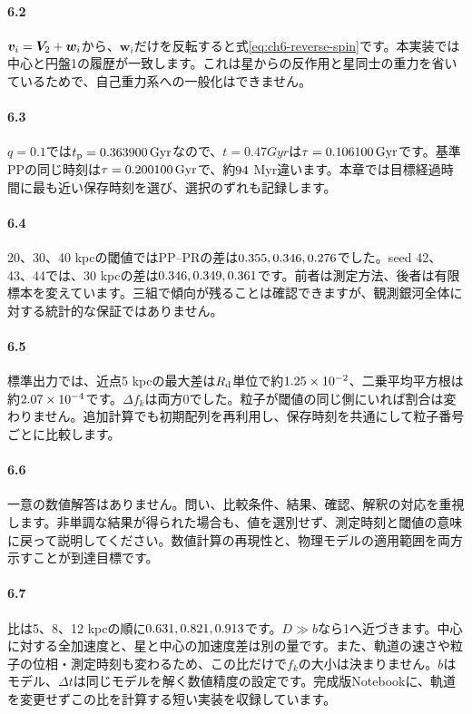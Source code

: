 \paragraph{6.2}
$\boldsymbol v_i=\boldsymbol V_2+\boldsymbol w_i$から、$\boldsymbol w_i$だけを反転すると式\eqref{eq:ch6-reverse-spin}です。本実装では中心と円盤1の履歴が一致します。これは星からの反作用と星同士の重力を省いているためで、自己重力系への一般化はできません。

\paragraph{6.3}
$q=0.1$では$t_{\rm p}=0.363900\,\mathrm{Gyr}$なので、$t=0.47\unit{Gyr}$は$\tau=0.106100\,\mathrm{Gyr}$です。基準PPの同じ時刻は$\tau=0.200100\,\mathrm{Gyr}$で、約$94$ Myr違います。本章では目標経過時間に最も近い保存時刻を選び、選択のずれも記録します。

\paragraph{6.4}
20、30、40 kpcの閾値ではPP--PRの差は$0.355,0.346,0.276$でした。seed 42、43、44では、30 kpcの差は$0.346,0.349,0.361$です。前者は測定方法、後者は有限標本を変えています。三組で傾向が残ることは確認できますが、観測銀河全体に対する統計的な保証ではありません。

\paragraph{6.5}
標準出力では、近点5 kpcの最大差は$R_{\rm d}$単位で約$1.25\times 10^{-2}$、二乗平均平方根は約$2.07\times 10^{-4}$です。$\Delta f_k$は両方0でした。粒子が閾値の同じ側にいれば割合は変わりません。追加計算でも初期配列を再利用し、保存時刻を共通にして粒子番号ごとに比較します。

\paragraph{6.6}
一意の数値解答はありません。問い、比較条件、結果、確認、解釈の対応を重視します。非単調な結果が得られた場合も、値を選別せず、測定時刻と閾値の意味に戻って説明してください。数値計算の再現性と、物理モデルの適用範囲を両方示すことが到達目標です。

\paragraph{6.7}
比は5、8、12 kpcの順に$0.631,0.821,0.913$です。$D\gg b$なら1へ近づきます。中心に対する全加速度と、星と中心の加速度差は別の量です。また、軌道の速さや粒子の位相・測定時刻も変わるため、この比だけで$f_k$の大小は決まりません。$b$はモデル、$\Delta t$は同じモデルを解く数値精度の設定です。完成版Notebookに、軌道を変更せずこの比を計算する短い実装を収録しています。

